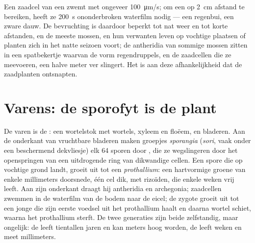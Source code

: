 \begin{example}\label{ex:b2:plant-life-cycles:sperm}
Een zaadcel van een  zwemt met ongeveer \qty{100}{\micro m/s}; om een
 op \qty{2}{cm} afstand te bereiken, heeft ze \qty{200}{s}
ononderbroken waterfilm nodig --- een regenbui, een zware dauw. De
bevruchting is daardoor beperkt tot nat weer en tot korte afstanden, en
de meeste mossen,  en hun verwanten leven op vochtige plaatsen of
planten zich in het natte seizoen voort; de antheridia van sommige
mossen zitten in een spatbekertje waarvan de vorm regendruppels, en de
zaadcellen die ze meevoeren, een halve meter ver slingert. Het is aan
deze afhankelijkheid dat de zaadplanten ontsnapten.
\end{example}

\section{Varens: de sporofyt is de plant}

\begin{definition}\label{def:b2:plant-life-cycles:fern}
De varen is de \emph{}: een wortelstok met wortels, xyleem en
floëem, en bladeren. Aan de onderkant van vruchtbare bladeren maken
groepjes \emph{sporangia} (\emph{sori}, vaak onder een beschermend
dekvliesje) elk 64 sporen door , die ze wegslingeren door het
openspringen van een uitdrogende ring van dikwandige cellen. Een spore
die op vochtige grond landt, groeit uit tot een \emph{prothallium}: een
hartvormige groene  van enkele millimeters doorsnede, één cel
dik, met rizoïden, die enkele weken vrij leeft. Aan zijn onderkant
draagt hij antheridia en archegonia; zaadcellen zwemmen in de waterfilm
van de bodem naar de eicel; de zygote groeit uit tot een jonge 
die zijn eerste voedsel uit het prothallium haalt en daarna wortel
schiet, waarna het prothallium sterft. De twee generaties zijn beide
zelfstandig, maar ongelijk: de  leeft tientallen jaren en kan
meters hoog worden, de  leeft weken en meet millimeters.
\end{definition}

